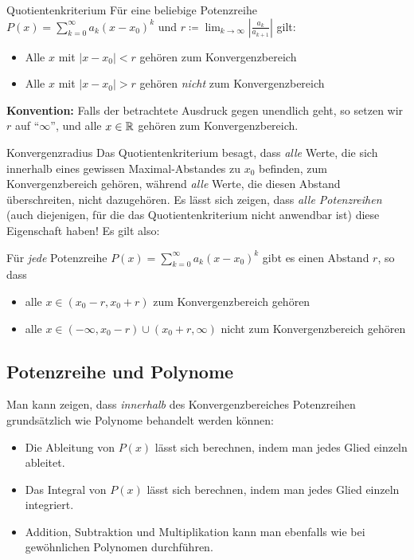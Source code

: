 \begin{definition}{Quotientenkriterium}
    Für eine beliebige Potenzreihe $P(x) = \sum_{k=0}^{\infty} a_k (x - x_0)^k$ und $r \coloneqq \lim_{k \rightarrow \infty} \left| \frac{a_k}{a_{k+1}} \right|$ gilt:
    \begin{itemize}
        \item Alle $x$ mit $|x - x_0| < r$ gehören zum Konvergenzbereich
        \item Alle $x$ mit $|x - x_0| > r$ gehören \emph{nicht} zum Konvergenzbereich
    \end{itemize}
\end{definition}

\textbf{Konvention:} Falls der betrachtete Ausdruck gegen unendlich geht, so setzen wir $r$ auf ``$\infty$'', und alle $x \in \mathbb{R}$ gehören zum Konvergenzbereich.

\begin{definition}{Konvergenzradius}
    Das Quotientenkriterium besagt, dass \emph{alle} Werte, die sich innerhalb eines gewissen Maximal-Abstandes zu $x_0$ befinden, zum Konvergenzbereich gehören, während \emph{alle} Werte, die diesen Abstand überschreiten, nicht dazugehören.
    Es lässt sich zeigen, dass \emph{alle Potenzreihen} (auch diejenigen, für die das Quotientenkriterium nicht anwendbar ist) diese Eigenschaft haben!
    Es gilt also:

    Für \emph{jede} Potenzreihe $P(x) = \sum_{k=0}^{\infty} a_k (x - x_0)^k$ gibt es einen Abstand $r$, so dass
    \begin{itemize}
        \item alle $x \in (x_0 - r, x_0 + r)$ zum Konvergenzbereich gehören
        \item alle $x \in (-\infty, x_0 - r) \cup (x_0 + r, \infty)$ nicht zum Konvergenzbereich gehören
    \end{itemize}
\end{definition}

\subsection{Potenzreihe und Polynome}\label{subsec:potenzreihe-und-polynome}

Man kann zeigen, dass \emph{innerhalb} des Konvergenzbereiches Potenzreihen grundsätzlich wie Polynome behandelt werden können:
\begin{itemize}
    \item Die Ableitung von $P(x)$ lässt sich berechnen, indem man jedes Glied einzeln ableitet.
    \item Das Integral von $P(x)$ lässt sich berechnen, indem man jedes Glied einzeln integriert.
    \item Addition, Subtraktion und Multiplikation kann man ebenfalls wie bei gewöhnlichen Polynomen durchführen.
\end{itemize}

